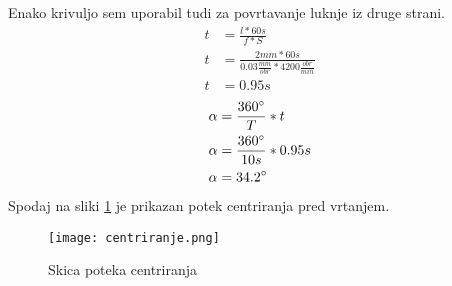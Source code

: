 Enako krivuljo sem uporabil tudi za povrtavanje luknje iz druge strani.
\begin{equation}
	\begin{split}
		t &= \frac{l*60s}{f*S} \\
		t &= \frac{2mm*60s}{0.03\frac{mm}{obr}*4200\frac{obr}{min}} \\
		t &= 0.95 s
	\end{split}
\end{equation}
\begin{equation}
	\begin{split}
		\alpha &= \frac{360\degree}{T} * t \\
		\alpha &= \frac{360\degree}{10s} * 0.95 s\\
		\alpha &= 34.2\degree
	\end{split}
\end{equation}
Spodaj na sliki \ref{centriranje} je prikazan potek
centriranja pred vrtanjem.
\begin{figure}[H]
	\begin{center}
		\texttt{[image: centriranje.png]}
		\caption{Skica poteka centriranja
			\cite{lasten}}
		\label{centriranje}
	\end{center}
\end{figure}
